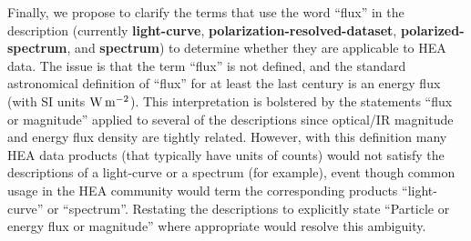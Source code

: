 \documentclass[11pt,a4paper]{ivoa}
\begin{document}
Finally, we propose to clarify the terms that use the word ``flux'' in the description (currently {\bf light-curve}, {\bf polarization-resolved-dataset}, {\bf polarized-spectrum}, and {\bf spectrum}) to determine whether they are applicable to HEA data.  The issue is that the term ``flux'' is not defined, and the standard astronomical definition of ``flux'' for at least the last century is an energy flux (with SI units $\rm W\,m^{-2}$).  This interpretation is bolstered by the statements ``flux or magnitude'' applied to several of the descriptions since optical/IR magnitude and energy flux density are tightly related.  However, with this definition many HEA data products (that typically have units of counts) would not satisfy the descriptions of a light-curve or a spectrum (for example), event though common usage in the HEA community would term the corresponding products ``light-curve'' or ``spectrum''.  Restating the descriptions to explicitly state ``Particle or energy flux or magnitude'' where appropriate would resolve this ambiguity.
\end{document}
